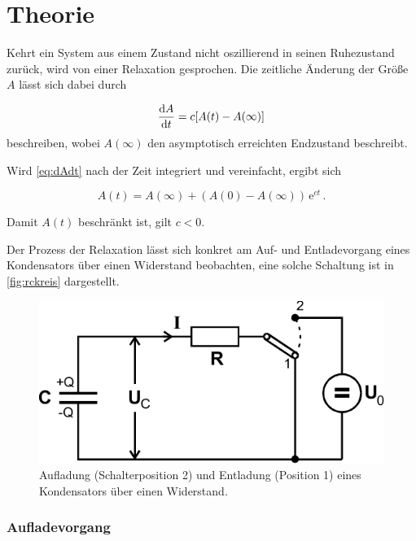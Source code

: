 \section{Theorie}
\label{sec:Theorie}

Kehrt ein System aus einem Zustand nicht oszillierend in seinen Ruhezustand zurück, wird von einer Relaxation gesprochen.
Die zeitliche Änderung der Größe $A$ lässt sich dabei durch

\begin{equation}
    \frac{\mathrm{d} A}{\mathrm{d} t} = c[A(t) - A(\infty)]
    \label{eq:dAdt}
\end{equation} beschreiben, wobei $A(\infty)$ den asymptotisch erreichten Endzustand beschreibt.

Wird \eqref{eq:dAdt} nach der Zeit integriert und vereinfacht, ergibt sich

\begin{equation}
    A(t) = A(\infty) + (A(0) - A(\infty)) \,\mathrm{e}^{ct} \,.
    \label{eq:At}
\end{equation}

Damit $A(t)$ beschränkt ist, gilt $c < 0$.

Der Prozess der Relaxation lässt sich konkret am Auf- und Entladevorgang eines Kondensators über einen Widerstand beobachten, eine solche Schaltung ist in \autoref{fig:rckreis} dargestellt.

\begin{figure}[H]
    \centering
    \includegraphics{figures/RC-Kreis.pdf}
    \caption{Aufladung (Schalterposition 2) und Entladung (Position 1) eines Kondensators über einen Widerstand\cite{ap08}.}
    \label{fig:rckreis}
\end{figure}

\subsubsection{Aufladevorgang}

